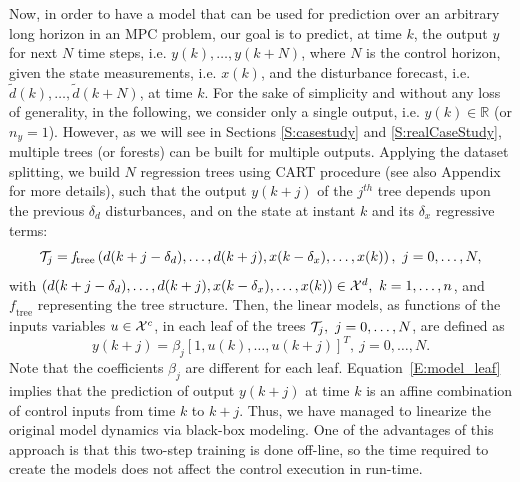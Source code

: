 \textcolor[rgb]{0,0,1}{Now, in order to have a model that can be used for prediction over an arbitrary long horizon in an MPC problem, our goal is to predict, at time $k$, the output $y$ for next $N$ time steps, i.e. $y(k),\ldots,y(k+N)$, where $N$ is the control horizon, given the state measurements, i.e. $x(k)$, and the disturbance forecast, i.e. $\tilde d(k),\ldots,\tilde d(k+N)$, at time $k$.
For the sake of simplicity and without any loss of generality, in the following, we consider only a single output, i.e. $y(k)\in\mathbb{R}$ (or $n_y = 1$).
However, as we will see in Sections \ref{S:casestudy} and \ref{S:realCaseStudy}, multiple trees (or forests) can be built for multiple outputs.
Applying the dataset splitting, we build $N$ regression trees using CART procedure \cite{Breiman1984} (see also Appendix for more details), such that the output $y(k+j)$ of the $j^{th}$ tree depends upon the previous $\delta_d$ disturbances, and on the state at instant $k$ and its $\delta_x$ regressive terms:
\begin{equation}\label{E:model_tree}
\T_j = \mathit{f}_{\mathrm{tree}} \left( d(k+j-\delta_d),\ldots,d(k+j),x(k-\delta_x),\ldots,x(k)  \right),\ j=0,\ldots,N,
\end{equation}
with $\left( d(k+j-\delta_d),\ldots,d(k+j),x(k-\delta_x),\ldots,x(k)  \right)\in\X^d,\ k=1,\ldots,n$, and $\mathit{f}_{\mathrm{tree}}$ representing the tree structure.
Then, the linear models, as functions of the inputs variables $u\in\mathcal{X}^c$, in each leaf of the trees $\T_j,\ j=0,\ldots,N$, are defined as
\begin{equation}\label{E:model_leaf}
y(k+j) =  \beta_j [1,u(k),\ldots,u(k+j) ]^T,\ j=0,\ldots,N.
\end{equation}}
Note that the coefficients $\beta_j$ are different for each leaf.
Equation~\eqref{E:model_leaf} implies that the prediction of output $y(k+j)$ at time $k$ is an affine combination of control inputs from time $k$ to $k+j$.
Thus, we have managed to linearize the original model dynamics via black-box modeling.
\textcolor[rgb]{0,0,1}{One of the advantages of this approach is that this two-step training is done off-line, so the time required to create the models does not affect the control execution in run-time.}

